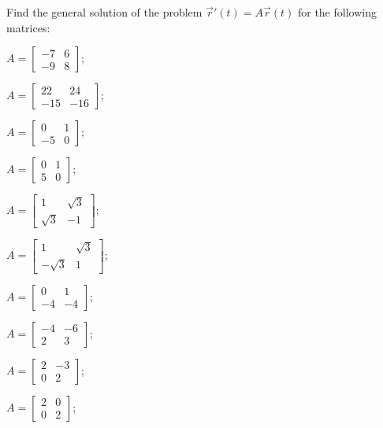 \begin{exercises}

	\begin{problist}
	\prob \label{mod16-gensol}Find the general solution of the problem $\vec{r}'(t) = A \vec{r}(t)$ for the following matrices:
	\begin{enumerate}
	\begin{minipage}{.2\textwidth}
		\item $A = \begin{bmatrix} -7 & 6 \\ -9 & 8 \end{bmatrix}$;
		\item $A = \begin{bmatrix} 22 & 24 \\ -15 & -16\end{bmatrix}$;
		\item $A = \begin{bmatrix} 0 & 1 \\ -5 & 0 \end{bmatrix}$;
		\item $A = \begin{bmatrix} 0 & 1 \\ 5 & 0 \end{bmatrix}$;
		\item $A = \begin{bmatrix} 1 & \sqrt{3} \\ \sqrt{3} & -1\end{bmatrix}$;
		\item $A = \begin{bmatrix} 1 & \sqrt{3} \\ -\sqrt{3} & 1\end{bmatrix}$;
	\end{minipage}
	\qquad
	\begin{minipage}{.2\textwidth}
		\item $A = \begin{bmatrix} 0 & 1 \\ -4 & -4 \end{bmatrix}$;
		\item $A = \begin{bmatrix} -4 & -6 \\ 2 & 3 \end{bmatrix}$;
		\item $A = \begin{bmatrix} 2 & -3 \\ 0 & 2 \end{bmatrix}$;
		\item $A = \begin{bmatrix} 2 & 0 \\ 0 & 2 \end{bmatrix}$;

\end{minipage}
\end{enumerate}
\end{problist}
\end{exercises}
